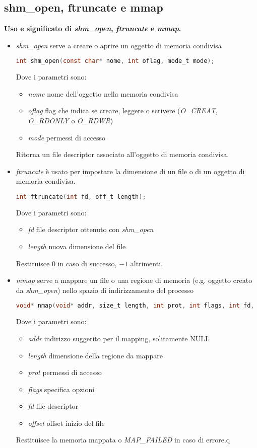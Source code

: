 \subsection{shm\_open, ftruncate e mmap}
\textbf{Uso e significato di \textit{shm\_open}, \textit{ftruncate} e \textit{mmap}.}\\
\begin{itemize}
	\item \textit{shm\_open} serve a creare o aprire un oggetto di memoria condivisa
	\begin{lstlisting}[language=C]
		int shm_open(const char* nome, int oflag, mode_t mode);
	\end{lstlisting}
	Dove i parametri sono:
	\begin{itemize}
		\item \textit{nome} nome dell'oggetto nella memoria condivisa
		\item \textit{oflag} flag che indica se creare, leggere o scrivere (\textit{O\_CREAT}, \textit{O\_RDONLY} o \textit{O\_RDWR})
		\item \textit{mode} permessi di accesso
	\end{itemize}
	Ritorna un file descriptor associato all'oggetto di memoria condivisa.
	\item \textit{ftruncate} è usato per impostare la dimensione di un file o di un oggetto di memoria condivisa.
	\begin{lstlisting}[language=C]
		int ftruncate(int fd, off_t length);
	\end{lstlisting}
	Dove i parametri sono:
	\begin{itemize}
		\item \textit{fd} file descriptor ottenuto con \textit{shm\_open}
		\item \textit{length} nuova dimensione del file
	\end{itemize}
	Restituisce $0$ in caso di successo, $-1$ altrimenti.
	\item \textit{mmap} serve a mappare un file o una regione di memoria (e.g. oggetto creato da \textit{shm\_open}) nello spazio di indirizzamento del processo
	\begin{lstlisting}[language=C]
		void* nmap(void* addr, size_t length, int prot, int flags, int fd, off_t offset);
	\end{lstlisting}
	Dove i parametri sono:
	\begin{itemize}
		\item \textit{addr} indirizzo suggerito per il mapping, solitamente NULL
		\item \textit{length} dimensione della regione da mappare
		\item \textit{prot} permessi di accesso
		\item \textit{flags} specifica opzioni
		\item \textit{fd} file descriptor
		\item \textit{offset} offset inizio del file
	\end{itemize}
	Restituisce la memoria mappata o \textit{MAP\_FAILED} in caso di errore.q
\end{itemize}

